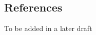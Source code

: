 \documentclass{acm_proc_article-sp}
\begin{document}
%

%
%
\appendix

\subsection{References}
To be added in a later draft

\balancecolumns
\end{document}

